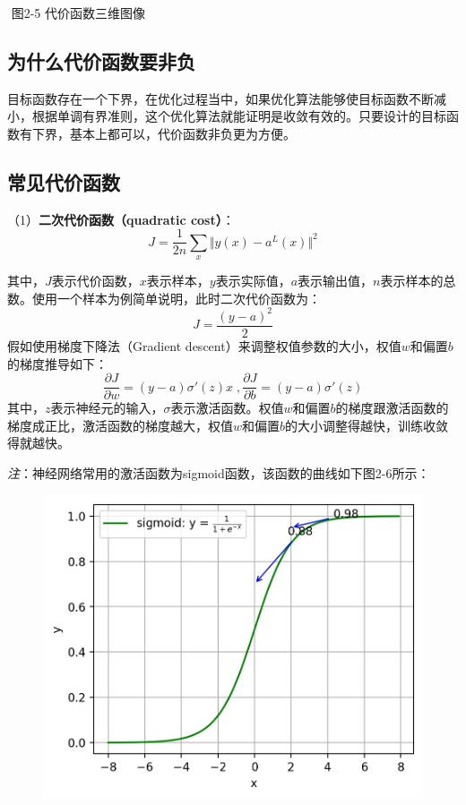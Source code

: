 ​ 图2-5 代价函数三维图像

\subsection{为什么代价函数要非负}\label{ux4e3aux4ec0ux4e48ux4ee3ux4ef7ux51fdux6570ux8981ux975eux8d1f}

​
目标函数存在一个下界，在优化过程当中，如果优化算法能够使目标函数不断减小，根据单调有界准则，这个优化算法就能证明是收敛有效的。
​ 只要设计的目标函数有下界，基本上都可以，代价函数非负更为方便。

\subsection{常见代价函数}\label{ux5e38ux89c1ux4ee3ux4ef7ux51fdux6570}

（1）\textbf{二次代价函数（quadratic cost）}： \[
J = \frac{1}{2n}\sum_x\Vert y(x)-a^L(x)\Vert^2
\]

​
其中，$J$表示代价函数，$x$表示样本，$y$表示实际值，$a$表示输出值，$n$表示样本的总数。使用一个样本为例简单说明，此时二次代价函数为：
\[
J = \frac{(y-a)^2}{2}
\] ​ 假如使用梯度下降法（Gradient
descent）来调整权值参数的大小，权值$w$和偏置$b$的梯度推导如下： \[
\frac{\partial J}{\partial w}=(y-a)\sigma'(z)x\;,
\frac{\partial J}{\partial b}=(y-a)\sigma'(z)
\]
其中，$z​$表示神经元的输入，$\sigma​$表示激活函数。权值$w​$和偏置$b​$的梯度跟激活函数的梯度成正比，激活函数的梯度越大，权值$w​$和偏置$b​$的大小调整得越快，训练收敛得就越快。

\emph{注}：神经网络常用的激活函数为sigmoid函数，该函数的曲线如下图2-6所示：

\begin{figure}
\centering
\includegraphics{./img/ch2/2.18/1.jpg}
\caption{}
\end{figure}

